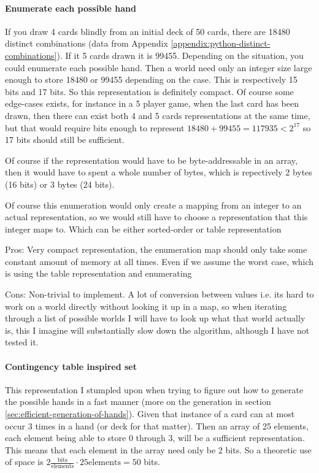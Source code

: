 \paragraph{Enumerate each possible hand}
If you draw 4 cards blindly from an initial deck of 50 cards, there are 18480 distinct combinations (data from Appendix \ref{appendix:python-distinct-combinations}). If it 5 cards drawn it is 99455. 
Depending on the situation, you could enumerate each possible hand. Then a world need only an integer size large enough to store 18480 or 99455 depending on the case. This is respectively 15 bits and 17 bits.
So this representation is definitely compact. Of course some edge-cases exists, for instance in a 5 player game, when the last card has been drawn, then there can exist both 4 and 5 cards representations at the same time, but that would require bits enough to represent $18480+99455 = 117935 < 2^{17}$ so 17 bits should still be sufficient.

Of course if the representation would have to be byte-addressable in an array, then it would have to spent a whole number of bytes, which is repectively 2 bytes (16 bits) or 3 bytes (24 bits).

Of course this enumeration would only create a mapping from an integer to an actual representation, so we would still have to choose a representation that this integer maps to. Which can be either sorted-order or table representation

Pros: Very compact representation, the enumeration map should only take some constant amount of memory at all times. Even if we assume the worst case, which is using the table representation and enumerating

Cons: Non-trivial to implement. A lot of conversion between values i.e. its hard to work on a world directly without looking it up in a map, so when iterating through a list of possible worlds I will have to look up what that world actually is, this I imagine will substantially slow down the algorithm, although I have not tested it.

\paragraph{Contingency table inspired set}
This representation I stumpled upon when trying to figure out how to generate the possible hands in a fast manner (more on the generation in section \ref{sec:efficient-generation-of-hands}).
Given that instance of a card can at most occur 3 times in a hand (or deck for that matter). Then an array of 25 elements, each element being able to store 0 through 3, will be a sufficient representation. This means that each element in the array need only be 2 bits. So a theoretic use of space is $2 \frac{\text{bits}}{\text{elements}} \cdot 25\text{elements} = 50$ bits. 

